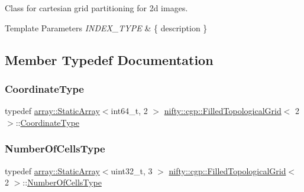 Class for cartesian grid partitioning for 2d images. 


\begin{DoxyTemplParams}{Template Parameters}
{\em I\+N\+D\+E\+X\+\_\+\+T\+Y\+PE} & \{ description \} \\
\hline
\end{DoxyTemplParams}


\subsection{Member Typedef Documentation}
\mbox{\label{classnifty_1_1cgp_1_1FilledTopologicalGrid_3_012_01_4_a744d1529d7bb50ca95236a5abaded0ad}} 
\subsubsection{\texorpdfstring{Coordinate\+Type}{CoordinateType}}
{\footnotesize\ttfamily typedef \hyperlink{namespacenifty_1_1array_a683f151f19c851754e0c6d55ed16a0c2}{array\+::\+Static\+Array}$<$int64\+\_\+t, 2 $>$ \hyperlink{classnifty_1_1cgp_1_1FilledTopologicalGrid}{nifty\+::cgp\+::\+Filled\+Topological\+Grid}$<$ 2 $>$\+::\hyperlink{classnifty_1_1cgp_1_1FilledTopologicalGrid_3_012_01_4_a744d1529d7bb50ca95236a5abaded0ad}{Coordinate\+Type}}

\mbox{\label{classnifty_1_1cgp_1_1FilledTopologicalGrid_3_012_01_4_a4026316cb9c7a8e6958cb32e6324ea7d}} 
\subsubsection{\texorpdfstring{Number\+Of\+Cells\+Type}{NumberOfCellsType}}
{\footnotesize\ttfamily typedef \hyperlink{namespacenifty_1_1array_a683f151f19c851754e0c6d55ed16a0c2}{array\+::\+Static\+Array}$<$uint32\+\_\+t, 3 $>$ \hyperlink{classnifty_1_1cgp_1_1FilledTopologicalGrid}{nifty\+::cgp\+::\+Filled\+Topological\+Grid}$<$ 2 $>$\+::\hyperlink{classnifty_1_1cgp_1_1FilledTopologicalGrid_3_012_01_4_a4026316cb9c7a8e6958cb32e6324ea7d}{Number\+Of\+Cells\+Type}}

